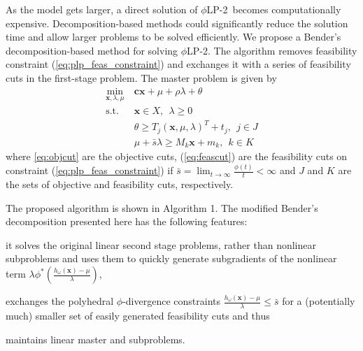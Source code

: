 \documentclass[12pt]{article}
\newcommand{\x}{\mathbf{x}}
\renewcommand{\c}{\mathbf{c}}
\theoremstyle{plain}
\theoremstyle{definition}
\theoremstyle{remark}
\newcommand{\st}{\mbox{s.t.}}
\newcommand{\plp}{$\phi$LP-2}
\begin{document}
As the model gets larger, a direct solution of \plp\ becomes computationally expensive. 
Decomposition-based methods could significantly reduce the solution time and allow larger problems to be solved efficiently. We propose a Bender's decomposition-based method for solving \plp.
The algorithm removes feasibility constraint (\ref{eq:plp_feas_constraint})  and exchanges it with a series of feasibility cuts in the first-stage problem.
The master problem is given by
\begin{align}
	\min_{\x,\lambda,\mu} \ & \c\x + \mu + \rho \lambda + \theta \label{eq:master_problem}\\
	\st \ & \x \in X,\ \ \lambda \geq 0 \nonumber  \\
	& \theta \geq T_j (\x,\mu,\lambda)^T + t_j, \ \  j \in J  \label{eq:objcut} \\
	& \mu + \bar{s}\lambda \geq M_k \x + m_k, \ \ k \in K \label{eq:feascut} 
\end{align}
where \eqref{eq:objcut} are the objective cuts, (\ref{eq:feascut}) are the feasibility cuts on constraint (\ref{eq:plp_feas_constraint}) if $\bar{s} = \lim_{t \rightarrow \infty} \frac{\phi(t)}{t} < \infty$ and $J$ and $K$ are the sets of objective and feasibility cuts, respectively.

The proposed algorithm is shown in Algorithm 1. 
The modified Bender's decomposition presented here has the following features:
\begin{inparaenum}
	\item it solves the original linear second stage problems, rather than nonlinear subproblems and uses them to quickly generate subgradients of the nonlinear term $\lambda \phi^*\left(\tfrac{h_\omega(\x) - \mu}{\lambda}\right)$, 
	\item exchanges the polyhedral $\phi$-divergence constraints $\tfrac{h_\omega(\x) - \mu}{\lambda} \leq \bar{s}$ for a (potentially much) smaller set of easily generated feasibility cuts and thus
	\item  maintains linear master and subproblems.\medskip
\end{inparaenum}
\end{document}
